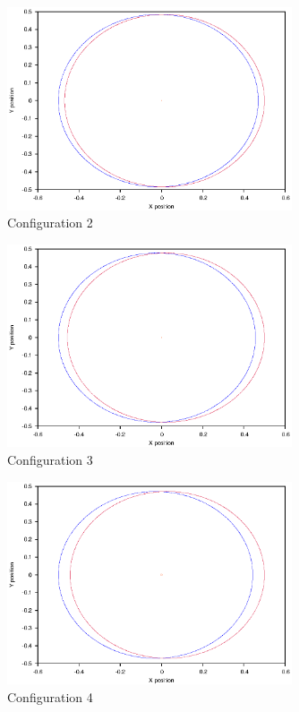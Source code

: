 \documentclass[a4paper,12pt]{article}
\begin{document}
\begin{figure}[H]
\centering
\includegraphics[width=0.75\textwidth]{./results/002-5-001/Orbit.eps}
\caption{Configuration 2}
\label{fig:config2}
\end{figure}
\begin{figure}[H]
\centering
\includegraphics[width=0.75\textwidth]{./results/003-5-001/Orbit.eps}
\caption{Configuration 3}
\label{fig:config3}
\end{figure}
\begin{figure}[H]
\centering
\includegraphics[width=0.75\textwidth]{./results/004-5-004/Orbit.eps}
\caption{Configuration 4}
\label{fig:config4}
\end{figure}
\end{document}

